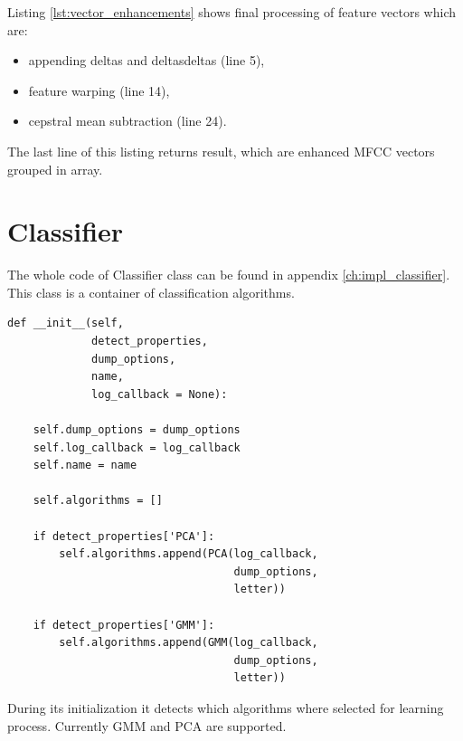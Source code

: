 \documentclass[magister]{dyplom}
\begin{document}
	Listing \ref{lst:vector_enhancements} shows final processing of feature vectors which are:
	
	\begin{itemize}
		\item appending deltas and deltasdeltas (line 5),
		\item feature warping (line 14),
		\item cepstral mean subtraction (line 24).
	\end{itemize}
		
	The last line of this listing returns result, which are enhanced \gls{MFCC} vectors grouped in array.
		
	\section{Classifier}
		
	The whole code of Classifier class can be found in appendix \ref{ch:impl_classifier}. This class is a container of classification algorithms.\\
	
	\begingroup
	\begin{verbatim}
def __init__(self,
             detect_properties,
             dump_options,
             name,
             log_callback = None):

    self.dump_options = dump_options
    self.log_callback = log_callback
    self.name = name

    self.algorithms = []

    if detect_properties['PCA']:
        self.algorithms.append(PCA(log_callback,
                                   dump_options,
                                   letter))

    if detect_properties['GMM']:
        self.algorithms.append(GMM(log_callback,
                                   dump_options,
                                   letter))
	\end{verbatim}
	\endgroup
	\vspace{1em}
	
	During its initialization it detects which algorithms where selected for learning process. Currently \gls{GMM} and \gls{PCA} are supported.\\
	
\end{document}
